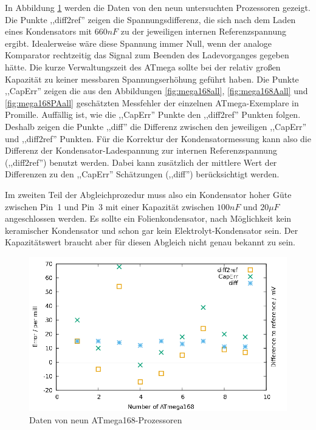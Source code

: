 In Abbildung \ref{fig:CompAdjust} werden die Daten von den neun untersuchten Prozessoren gezeigt.
Die Punkte ,,diff2ref'' zeigen die Spannungsdifferenz, die sich nach dem Laden eines Kondensators mit \(660nF\) zu der
jeweiligen internen Referenzspannung ergibt. Idealerweise wäre diese Spannung immer Null, wenn der analoge
Komparator rechtzeitig das Signal zum Beenden des Ladevorganges gegeben hätte. Die kurze Verwaltungszeit des ATmega
sollte bei der relativ großen Kapazität zu keiner messbaren Spannungserhöhung geführt haben.
Die Punkte ,,CapErr'' zeigen die aus den Abbildungen \ref{fig:mega168all}, \ref{fig:mega168Aall} und \ref{fig:mega168PAall} 
geschätzten Messfehler der einzelnen ATmega-Exemplare in Promille.
Auffällig ist, wie die ,,CapErr'' Punkte den ,,diff2ref'' Punkten folgen.
Deshalb zeigen die Punkte ,,diff'' die Differenz zwischen den jeweiligen ,,CapErr'' und ,,diff2ref'' Punkten.
Für die Korrektur der Kondensatormessung kann also die Differenz der Kondensator-Ladespannung zur internen Referenzspannung
(,,diff2ref'') benutzt werden.
Dabei kann zusätzlich der mittlere Wert der Differenzen zu den ,,CapErr'' Schätzungen (,,diff'') berücksichtigt werden.

Im zweiten Teil der Abgleichprozedur muss also ein Kondensator hoher Güte zwischen Pin~1 und Pin~3 mit einer
Kapazität zwischen \(100nF\) und \(20\mu F\) angeschlossen werden. 
Es sollte ein Folienkondensator, nach Möglichkeit kein keramischer Kondensator und schon gar kein
Elektrolyt-Kondensator sein. Der Kapazitätswert braucht aber für diesen Abgleich nicht genau bekannt zu sein.

\begin{figure}[H]
\centering
\includegraphics[]{../GNU/ComparatorAdjust.pdf}
\caption{Daten von neun ATmega168-Prozessoren}
\label{fig:CompAdjust}
\end{figure}

